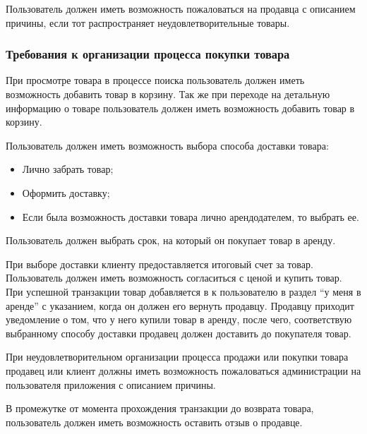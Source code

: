 Пользователь должен иметь возможность пожаловаться на продавца с описанием причины, если тот распространяет неудовлетворительные товары.

\subsubsection{Требования к организации процесса покупки товара}

При просмотре товара в процессе поиска пользователь должен иметь возможность добавить товар в корзину.
Так же при переходе на детальную информацию о товаре пользователь должен иметь возможность добавить товар в корзину.

Пользователь должен иметь возможность выбора способа доставки товара:
\begin{itemize}
    \item Лично забрать товар;
    \item Оформить доставку;
    \item Если была возможность доставки товара лично арендодателем, то выбрать ее.
\end{itemize}

Пользователь должен выбрать срок, на который он покупает товар в аренду.

При выборе доставки клиенту предоставляется итоговый счет за товар.
Пользователь должен иметь возможность согласиться с ценой и купить товар.
При успешной транзакции товар добавляется в к пользователю в раздел “у меня в аренде” с указанием, когда он должен его вернуть продавцу.
Продавцу приходит уведомление о том, что у него купили товар в аренду, после чего, соответствую выбранному способу доставки продавец должен доставить до покупателя товар.

При неудовлетворительном организации процесса продажи или покупки товара продавец или клиент должны иметь возможность пожаловаться администрации на пользователя приложения с описанием причины.

В промежутке от момента прохождения транзакции до возврата товара, пользователь должен иметь возможность оставить отзыв о продавце.
